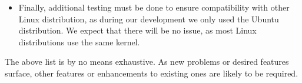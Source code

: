 \begin{itemize}
\item Finally, additional testing must be done to ensure compatibility with other Linux distribution, as during our development we only used the Ubuntu distribution. We expect that there will be no issue, as most Linux distributions use the same kernel.


\end{itemize}

\par The above list is by no means exhaustive. As new problems or desired features surface, other features or enhancements to existing ones are likely to be required. 



